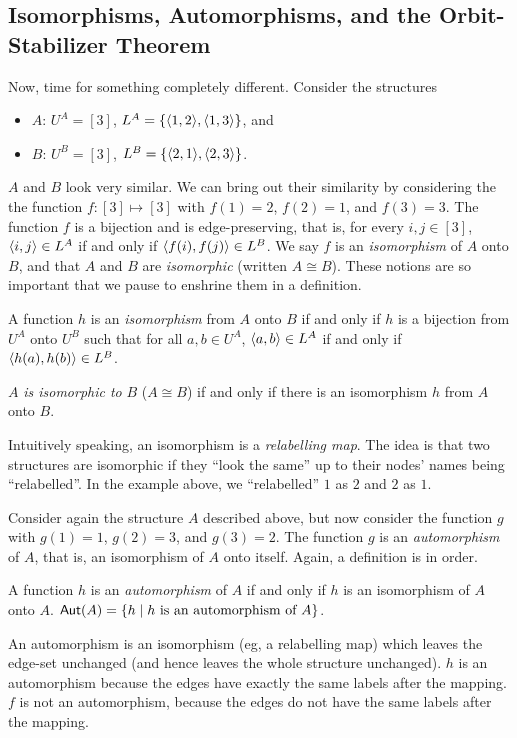 \subsection{Isomorphisms, Automorphisms, and the Orbit-Stabilizer Theorem}
Now, time for something completely different. Consider the structures
\begin{itemize}
\item $A$: $U^A=[3]$, $L^A=\{\mbox{$\langle 1,2 \rangle$},\mbox{$\langle 1,3 \rangle$}\}$, and
\item $B$: $U^B=[3]$, $L^B=\{\mbox{$\langle 2,1 \rangle$},\mbox{$\langle 2,3 \rangle$}\}$.
\end{itemize}
$A$ and $B$ look very similar. We can bring out their similarity by considering the the function $f:[3]\mapsto[3]$ with $f(1)=2$, $f(2)=1$, and $f(3)=3$. The function $f$ is a bijection and is edge-preserving, that is, for every $i,j\in[3]$, $\mbox{$\langle i,j \rangle$}\in L^A$ if and only if $\mbox{$\langle f(i),f(j) \rangle$}\in L^B$. We say $f$ is an \emph{isomorphism} of $A$ onto $B$, and that $A$ and $B$ are \emph{isomorphic} (written $A\cong B$). These notions are so important that we pause to enshrine them in a definition.
\begin{definition}
A function $h$ is an \emph{isomorphism} from $A$ onto $B$ if and only if $h$ is a bijection from $U^A$ onto $U^B$ such that for all $a,b\in U^A$, $\mbox{$\langle a,b \rangle$}\in L^A$ if and only if $\mbox{$\langle h(a),h(b) \rangle$}\in L^B$.

$A$ \emph{is isomorphic to} $B$ ($A\cong B$) if and only if there is an isomorphism $h$ from $A$ onto $B$.
\end{definition}
\begin{aside}
    Intuitively speaking, an isomorphism is a \emph{relabelling map}. The idea is that two structures are isomorphic if they ``look the same'' up to their nodes' names being ``relabelled''. In the example above, we ``relabelled'' $1$ as $2$ and $2$ as $1$. 
\end{aside}

Consider again the structure $A$ described above, but now consider the function $g$ with $g(1)=1$, $g(2)=3$, and $g(3)=2$. The function $g$ is an \emph{automorphism} of $A$, that is, an isomorphism of $A$ onto itself. Again, a definition is in order.
\begin{definition}
A function $h$ is an \emph{automorphism} of $A$  if and only if $h$ is an isomorphism of $A$ onto $A$. $\mbox{$\mathsf{Aut}(A)$}=\{h\mid h\mbox{ is an automorphism of }A\}$.
\end{definition}

\begin{aside}
    An automorphism is an isomorphism (eg, a relabelling map) which leaves the edge-set unchanged (and hence leaves the whole structure unchanged). $h$ is an automorphism because the edges have exactly the same labels after the mapping. $f$ is not an automorphism, because the edges do not have the same labels after the mapping. 
\end{aside}


